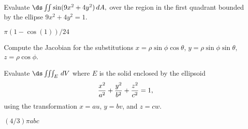 \begin{enumialphparenastyle}
\begin{ex}
Evaluate $\ds\iint \sin(9x^2 + 4y^2)\,dA,$ over the region
 in the first quadrant bounded by the ellipse $9x^2+4y^2 = 1$.
\begin{sol}
$\pi(1-\cos(1))/24$
\end{sol}
\end{ex}

\begin{ex}
Compute the Jacobian for the substitutions 
$x=\rho\sin\phi\cos\theta$, $y=\rho\sin\phi\sin\theta$, 
$z=\rho\cos\phi$.
\end{ex}

\begin{ex}
Evaluate $\ds\iiint_E\,dV$ where $E$ is the solid
enclosed by the ellipsoid
$${x^2\over a^2} + {y^2\over b^2} + {z^2\over c^2} = 1,$$ 
using the transformation $x=au$, $y=bv$, and $z=cw$.
\begin{sol}
$(4/3)\pi abc$
\end{sol}
\end{ex}

\end{enumialphparenastyle}